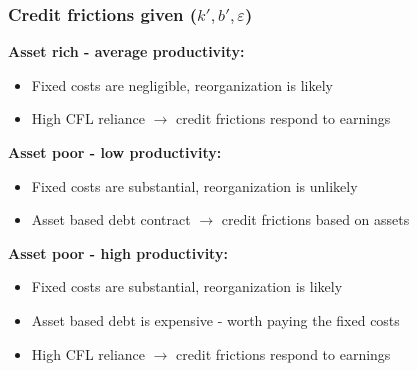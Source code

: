\documentclass[notes]{beamer}
\begin{document}
\begin{frame}[label=intuition] \frametitle{Credit frictions given ($k',b',\varepsilon$)}

\textbf{Asset rich - average productivity: }
\begin{itemize} \setlength\itemsep{0em}
    \item Fixed costs are negligible, reorganization is likely
    \item High CFL reliance $\rightarrow$ credit frictions respond to earnings 
\end{itemize}

\textbf{Asset poor - low productivity: }
\begin{itemize} \setlength\itemsep{0em}
    \item Fixed costs are substantial, reorganization is unlikely
    \item Asset based debt contract $\rightarrow$ credit frictions based on assets 
\end{itemize}

\textbf{Asset poor - high productivity: }
\begin{itemize} \setlength\itemsep{0em}
    \item Fixed costs are substantial, reorganization is likely
    \item Asset based debt is expensive - worth paying the fixed costs
    \item High CFL reliance $\rightarrow$ credit frictions respond to earnings 
\end{itemize}

\begin{center}
\hyperlink{CFLrel}{}
\end{center}

\end{frame}
\end{document}
